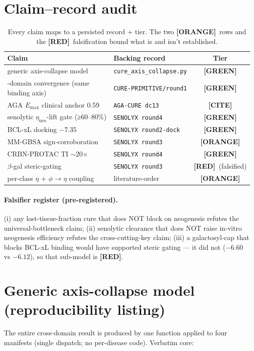 \documentclass[11pt,a4paper]{article}
\newcommand{\tierbadge}[2]{\textcolor{#1}{\textbf{[#2]}}}
\providecommand{\tierGreen}{\tierbadge{green!45!black}{GREEN}}
\providecommand{\tierYellow}{\tierbadge{yellow!50!black}{CITE}}
\providecommand{\tierOrange}{\tierbadge{orange!80!black}{ORANGE}}
\providecommand{\tierRed}{\tierbadge{red!75!black}{RED}}
\begin{document}
\section{Claim--record audit}
\label{app:audit}
\begin{table}[h]\centering\small
\begin{tabular}{@{}>{\raggedright\arraybackslash}m{7.2cm} >{\raggedright\arraybackslash}m{3.8cm} c@{}}
\toprule
\textbf{Claim} & \textbf{Backing record} & \textbf{Tier} \\
\midrule
generic axis-collapse model & \texttt{cure\_axis\_collapse.py} & \tierGreen \\
4-domain convergence (same binding axis) & \texttt{CURE-PRIMITIVE/round1} & \tierGreen \\
AGA $E_{\max}$ clinical anchor 0.59 & \texttt{AGA-CURE dc13} & \tierYellow \\
senolytic $\eta_{\text{neo}}$-lift gate (≥60--80\%) & \texttt{SENOLYX round4} & \tierGreen \\
BCL-xL docking $-7.35$ & \texttt{SENOLYX round2-dock} & \tierGreen \\
MM-GBSA sign-corroboration & \texttt{SENOLYX round3} & \tierOrange \\
CRBN-PROTAC TI $\sim$20$\times$ & \texttt{SENOLYX round4} & \tierGreen \\
$\beta$-gal steric-gating & \texttt{SENOLYX round3} & \tierRed\ (falsified) \\
per-class $\eta$ + $\phi\!\to\!\eta$ coupling & literature-order & \tierOrange \\
\bottomrule
\end{tabular}
\caption{Every claim maps to a persisted record + tier. The two \tierOrange\ rows and the
\tierRed\ falsification bound what is and isn't established.}
\label{tab:audit}
\end{table}

\paragraph{Falsifier register (pre-registered).} (i) any lost-tissue-fraction cure that does
NOT block on neogenesis refutes the universal-bottleneck claim; (ii) senolytic clearance that
does NOT raise in-vitro neogenesis efficiency refutes the cross-cutting-key claim; (iii) a
galactosyl-cap that blocks BCL-xL binding would have supported steric gating --- it did not
($-6.60$ vs $-6.12$), so that sub-model is \tierRed.

\section{Generic axis-collapse model (reproducibility listing)}
\label{app:code}
The entire cross-domain result is produced by one function applied to four manifests (single
dispatch; no per-disease code). Verbatim core:
\end{document}
